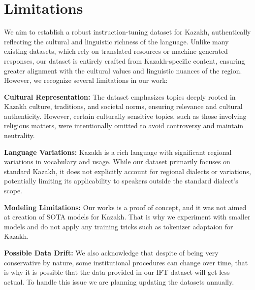 \section{Limitations}
We aim to establish a robust instruction-tuning dataset for Kazakh, authentically reflecting the cultural and linguistic richness of the language. Unlike many existing datasets, which rely on translated resources or machine-generated responses, our dataset is entirely crafted from Kazakh-specific content, ensuring greater alignment with the cultural values and linguistic nuances of the region. However, we recognize several limitations in our work:
\begin{compactitem}
\item \textbf{Cultural Representation:} The dataset emphasizes topics deeply rooted in Kazakh culture, traditions, and societal norms, ensuring relevance and cultural authenticity. However, certain culturally sensitive topics, such as those involving religious matters, were intentionally omitted to avoid controversy and maintain neutrality.
\item  \textbf{Language Variations:} Kazakh is a rich language with significant regional variations in vocabulary and usage. While our dataset primarily focuses on standard Kazakh, it does not explicitly account for regional dialects or variations, potentially limiting its applicability to speakers outside the standard dialect's scope.
\item \textbf{Modeling Limitations:} Our works is a proof of concept, and it was not aimed at creation of SOTA models for Kazakh. That is why we experiment with smaller models and do not apply any training tricks such as tokenizer adaptaion for Kazakh.
\item \textbf{Possible Data Drift:} We also acknowledge that despite of being very conservative by nature, some institutional procedures can change over time, that is why it is possible that the data provided in our IFT dataset will get less actual. To handle this issue we are planning updating the datasets annually.
    

\end{compactitem}
